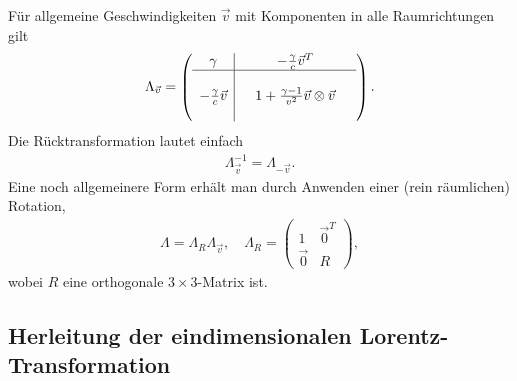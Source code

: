 Für allgemeine Geschwindigkeiten $\vec v$ mit Komponenten in alle Raumrichtungen gilt
\begin{align*}
    \Lambda_{\vec v}=
    \left(\begin{array}{c|ccc}
                  \gamma                   &  & -\frac{\gamma}{c}\vec{v}^T                    & \\
                  \hline
                                           &  &                                               & \\
                  -\frac{\gamma}{c}\vec{v} &  & 1 + \frac{\gamma-1}{v^2}\vec{v}\otimes\vec{v} & \\
                                           &  &                                               &
              \end{array}\right).
\end{align*}
Die Rücktransformation lautet einfach
\begin{align*}
    \Lambda^{-1}_{\vec v}= \Lambda_{-\vec v}.
\end{align*}
Eine noch allgemeinere Form erhält man durch Anwenden einer (rein räumlichen) Rotation,
\begin{align*}
    \Lambda = \Lambda_R\Lambda_{\vec v}, \quad \Lambda_R=\begin{pmatrix}
                                                             1      & \vec 0^T \\
                                                             \vec 0 & R
                                                         \end{pmatrix},
\end{align*}
wobei $R$ eine orthogonale $3\times 3$-Matrix ist.



\subsection{Herleitung der eindimensionalen Lorentz-Transformation\label{sec:herleitung_1D_lorentz_trafo}}

